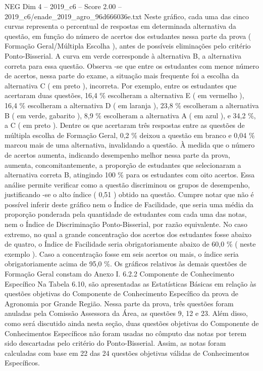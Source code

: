 \begin{textsample}{NEG Dim 4 – 2019\_c6 – Score 2.00 – 2019\_c6/enade\_2019\_agro\_96d666036e.txt}
Neste gráfico, cada uma das cinco curvas representa o percentual de respostas em determinada alternativa da questão, em função do número de acertos dos estudantes nessa parte da prova ( Formação Geral/Múltipla Escolha ), antes de possíveis eliminações pelo critério Ponto-Bisserial.
A curva em verde corresponde à alternativa B, a alternativa correta para essa questão.
Observa -se que entre os estudantes com menor número de acertos, nessa parte do exame, a situação mais frequente foi a escolha da alternativa C ( em preto ), incorreta.
Por exemplo, entre os estudantes que acertaram duas questões, 16,4 \% escolheram a alternativa E ( em vermelho ), 16,4 \% escolheram a alternativa D ( em laranja ), 23,8 \% escolheram a alternativa B ( em verde, gabarito ), 8,9 \% escolheram a alternativa A ( em azul ), e 34,2 \%, a C ( em preto ).
Dentre os que acertaram três respostas entre as questões de múltipla escolha de Formação Geral, 0,2 \% deixou a questão em branco e 0,04 \% marcou mais de uma alternativa, invalidando a questão.
À medida que o número de acertos aumenta, indicando desempenho melhor nessa parte da prova, aumenta, concomitantemente, a proporção de estudantes que selecionaram a alternativa correta B, atingindo 100 \% para os estudantes com oito acertos.
Essa análise permite verificar como a questão discriminou os grupos de desempenho, justificando -se o alto índice ( 0,51 ) obtido na questão.
Cumpre notar que não é possível inferir deste gráfico nem o Índice de Facilidade, que seria uma média da proporção ponderada pela quantidade de estudantes com cada uma das notas, nem o Índice de Discriminação Ponto-Bisserial, por razão equivalente.
No caso extremo, no qual a grande concentração dos acertos dos estudantes fosse abaixo de quatro, o Índice de Facilidade seria obrigatoriamente abaixo de 60,0 \% ( neste exemplo ).
Caso a concentração fosse em seis acertos ou mais, o índice seria obrigatoriamente acima de 95,0 \%.
Os gráficos relativos às demais questões de Formação Geral constam do Anexo I. 6.2.2 Componente de Conhecimento Específico Na Tabela 6.10, são apresentadas as Estatísticas Básicas em relação às questões objetivas do Componente de Conhecimento Específico da prova de Agronomia por Grande Região.
Nessa parte da prova, três questões foram anuladas pela Comissão Assessora da Área, as questões 9, 12 e 23.
Além disso, como será discutido ainda nesta seção, duas questões objetivas do Componente de Conhecimentos Específicos não foram usadas no cômputo das notas por terem sido descartadas pelo critério do Ponto-Bisserial.
Assim, as notas foram calculadas com base em 22 das 24 questões objetivas válidas de Conhecimentos Específicos.

\end{textsample}
